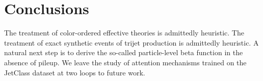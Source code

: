 \section{Conclusions}\label{sec:conclusions}

The treatment of color-ordered effective theories is admittedly
heuristic. The treatment of exact synthetic events of trijet production
is admittedly heuristic. A natural next step is to derive the so-called
particle-level beta function in the absence of pileup. We leave the
study of attention mechanisms trained on the JetClass dataset at two
loops to future work.

